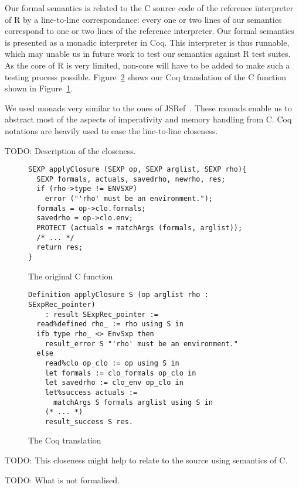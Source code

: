 \documentclass[9pt, sigplan, natbib=false, screen=true]{acmart}
\newcommand\Coq{Coq}
\newcommand\R{R}
\newcommand\Cn{C}
\begin{document}
Our formal semantics is related to the \Cn{} source code
of the reference interpreter of \R{}
by a line-to-line correspondance:
every one or two lines of our semantics
correspond to one or two lines of the reference interpreter.
Our formal semantics is presented as a monadic interpreter in \Coq{}.
This interpreter is thus runnable,
which may unable us in future work to test our semantics against
\R{} test suites.
As the core of \R{} is very limited,
non-core will have to be added to make such a testing process possible.
Figure~\ref{fig:coq} shows our \Coq{} translation
of the \Cn{} function shown in Figure~\ref{fig:c}.

We used monads very similar to the ones of JSRef~\parencite{popl14jscert}.
These monads enable us to abstract most of the aspects
of imperativity and memory handling from \Cn{}.
\Coq{} notations are heavily used to ease
the line-to-line closeness.

TODO: Description of the closeness.

\begin{figure}
\begin{verbatim}
SEXP applyClosure (SEXP op, SEXP arglist, SEXP rho){
  SEXP formals, actuals, savedrho, newrho, res;
  if (rho->type != ENVSXP)
    error ("'rho' must be an environment.");
  formals = op->clo.formals;
  savedrho = op->clo.env;
  PROTECT (actuals = matchArgs (formals, arglist));
  /* ... */
  return res;
}
\end{verbatim}
    \caption{The original \Cn{} function}
    \label{fig:c}
\end{figure}

\begin{figure}
\begin{verbatim}
Definition applyClosure S (op arglist rho : SExpRec_pointer)
    : result SExpRec_pointer :=
  read%defined rho_ := rho using S in
  ifb type rho_ <> EnvSxp then
    result_error S "'rho' must be an environment."
  else
    read%clo op_clo := op using S in
    let formals := clo_formals op_clo in
    let savedrho := clo_env op_clo in
    let%success actuals :=
      matchArgs S formals arglist using S in
    (* ... *)
    result_success S res.
\end{verbatim}
    \caption{The \Coq{} translation}
    \label{fig:coq}
\end{figure}

TODO: This closeness might help to relate to the source using semantics of \Cn{}.

TODO: What is not formalised.
\end{document}
